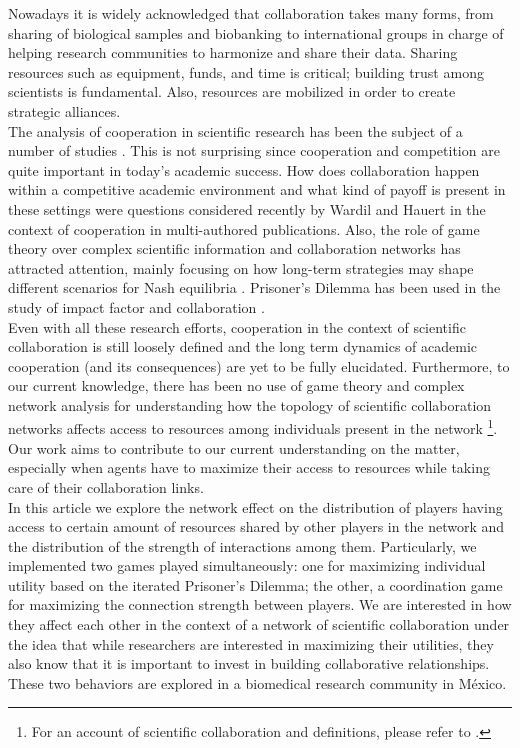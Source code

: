 \documentclass{bmcart}
\begin{document}
Nowadays it is widely acknowledged that collaboration takes many
forms, from sharing of biological samples and biobanking to
international groups in charge of helping research communities to
harmonize and share their data. Sharing resources such as equipment,
funds, and time is critical; building trust among scientists is
fundamental. Also, resources are mobilized in order to create strategic alliances.\\


The analysis of cooperation in scientific research has been the subject of a
number of studies
\cite{VermeulenPenders:2013,Newman:2001,Newman:2004,Elango-etal:2012,HernandezLemus:2013,Strasser:2006,Strasser:2012}. This
is not surprising since cooperation and competition are quite important in
today's academic success. How does collaboration happen within a competitive
academic environment and what kind of payoff is present in these settings were
questions considered recently by Wardil and Hauert \cite{Wardil-etal:2015} in the
context of cooperation in multi-authored publications. Also, the role of game
theory over complex scientific information and collaboration networks has
attracted attention, mainly focusing on how long-term strategies may shape
different scenarios for Nash equilibria \cite{Hanauske-etal:2012}. Prisoner's Dilemma
has been used in the study of impact factor and collaboration
\cite{Hara-etal:2003,LiebermanNowak:2005}. \\  

Even with all these research efforts, cooperation in the context of
scientific collaboration is still loosely defined and the long term
dynamics of academic cooperation (and its consequences) are yet to be
fully elucidated. Furthermore, to our current knowledge, there has
been no use of game theory and complex network analysis for
understanding how the topology of scientific collaboration networks
affects access to resources among individuals present in the network
\footnote{For an account of scientific collaboration and definitions,
  please refer to \cite{Sonnenwald:2007}.}. Our work aims to contribute
to our current understanding on the matter, especially when agents have
to maximize their access to resources while taking care of their collaboration links.\\
  

 In this article we explore the network effect on the distribution
   of players having access to certain amount of resources shared by other players in the
   network and the distribution of the strength of interactions among
   them. Particularly, we implemented two games played simultaneously: 
   one for maximizing individual utility based on the iterated Prisoner's
   Dilemma; the other, a coordination game for maximizing the connection strength between
   players. We are interested in how they affect each other in 
   the context of a network of scientific collaboration under the idea that while
   researchers are interested in maximizing their utilities, they also know that
   it is important to invest in building collaborative relationships. These two
   behaviors are explored in a biomedical research community in M\'exico.\\
\end{document}

